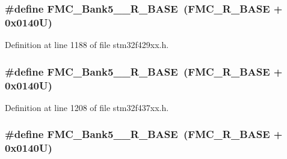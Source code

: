 \subsubsection[{\texorpdfstring{F\+M\+C\+\_\+\+Bank5\+\_\+6\+\_\+\+R\+\_\+\+B\+A\+SE}{FMC_Bank5_6_R_BASE}}]{\setlength{\rightskip}{0pt plus 5cm}\#define F\+M\+C\+\_\+\+Bank5\+\_\+\_\+\+R\+\_\+\+B\+A\+SE~({\bf F\+M\+C\+\_\+\+R\+\_\+\+B\+A\+SE} + 0x0140\+U)}\hypertarget{group___peripheral__memory__map_gace117149a4fc0d07c38cc997fe4c4a73}{}\label{group___peripheral__memory__map_gace117149a4fc0d07c38cc997fe4c4a73}


Definition at line 1188 of file stm32f429xx.\+h.

\subsubsection[{\texorpdfstring{F\+M\+C\+\_\+\+Bank5\+\_\+6\+\_\+\+R\+\_\+\+B\+A\+SE}{FMC_Bank5_6_R_BASE}}]{\setlength{\rightskip}{0pt plus 5cm}\#define F\+M\+C\+\_\+\+Bank5\+\_\+\_\+\+R\+\_\+\+B\+A\+SE~({\bf F\+M\+C\+\_\+\+R\+\_\+\+B\+A\+SE} + 0x0140\+U)}\hypertarget{group___peripheral__memory__map_gace117149a4fc0d07c38cc997fe4c4a73}{}\label{group___peripheral__memory__map_gace117149a4fc0d07c38cc997fe4c4a73}


Definition at line 1208 of file stm32f437xx.\+h.

\subsubsection[{\texorpdfstring{F\+M\+C\+\_\+\+Bank5\+\_\+6\+\_\+\+R\+\_\+\+B\+A\+SE}{FMC_Bank5_6_R_BASE}}]{\setlength{\rightskip}{0pt plus 5cm}\#define F\+M\+C\+\_\+\+Bank5\+\_\+\_\+\+R\+\_\+\+B\+A\+SE~({\bf F\+M\+C\+\_\+\+R\+\_\+\+B\+A\+SE} + 0x0140\+U)}\hypertarget{group___peripheral__memory__map_gace117149a4fc0d07c38cc997fe4c4a73}{}\label{group___peripheral__memory__map_gace117149a4fc0d07c38cc997fe4c4a73}


